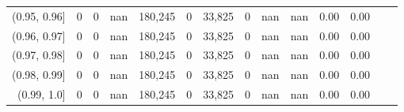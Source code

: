 \begin{tabular}{rrrrrrrrrrrrrr}
(0.95, 0.96]   &       0 &      0 &     nan &  180,245 &        0 &  33,825 &       0 &   nan &   nan &  0.00 &      0.00 \\
(0.96, 0.97]   &       0 &      0 &     nan &  180,245 &        0 &  33,825 &       0 &   nan &   nan &  0.00 &      0.00 \\
(0.97, 0.98]   &       0 &      0 &     nan &  180,245 &        0 &  33,825 &       0 &   nan &   nan &  0.00 &      0.00 \\
(0.98, 0.99]   &       0 &      0 &     nan &  180,245 &        0 &  33,825 &       0 &   nan &   nan &  0.00 &      0.00 \\
(0.99, 1.0]    &       0 &      0 &     nan &  180,245 &        0 &  33,825 &       0 &   nan &   nan &  0.00 &      0.00 \\
\bottomrule
\end{tabular}
